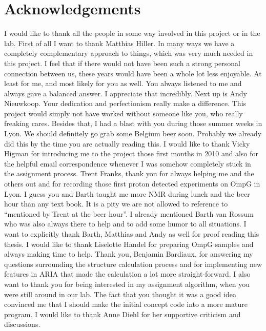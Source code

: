 
\frontmatter

\chapter*{Acknowledgements}



I would like to thank all the people in some way involved in this project or in the lab. First of all I want to thank Matthias Hiller. In many ways we have a completely complementary approach to things, which was very much needed in this project. I feel that if there would not have been such a strong personal connection between us, these years would have been a whole lot less enjoyable. At least for me, and most likely for you as well. You always listened to me and always gave a balanced answer. I appreciate that incredibly. Next up is Andy Nieuwkoop. Your dedication and perfectionism really make a difference. This project would simply not have worked without someone like you, who really freaking cares. Besides that, I had a blast with you during those summer weeks in Lyon. We should definitely go grab some Belgium beer soon. Probably we already did this by the time you are actually reading this. I would like to thank Vicky Higman for introducing me to the project those first months in 2010 and also for the helpful email correspondence whenever I was somehow completely stuck in the assignment process. Trent Franks, thank you for always helping me and the others out and for recording those first proton detected experiments on OmpG in Lyon. I guess you and Barth taught me more NMR during lunch and the beer hour than any text book. It is a pity we are not allowed to reference to ``mentioned by Trent at the beer hour''. I already mentioned Barth van Rossum who was also always there to help and to add some humor to all situations. I want to explicitly thank Barth, Matthias and Andy as well for proof reading this thesis. I would like to thank Liselotte Handel for preparing OmpG samples and always making time to help. Thank you, Benjamin Bardiaux, for answering my questions surrounding the structure calculation process and for implementing new features in ARIA that made the calculation a lot more straight-forward. I also want to thank you for being interested in my assignment algorithm, when you were still around in our lab. The fact that you thought it was a good idea convinced me that I should make the initial concept code into a more mature program. I would like to thank Anne Diehl for her supportive criticism and discussions.

